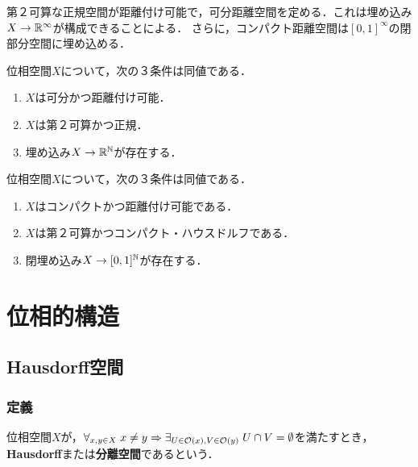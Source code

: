 \documentclass[uplatex,dvipdfmx]{jsreport}
\begin{document}
\begin{tcolorbox}[colframe=ForestGreen, colback=ForestGreen!10!white,breakable,colbacktitle=ForestGreen!40!white,coltitle=black,fonttitle=\bfseries\sffamily,
title=]
    第２可算な正規空間が距離付け可能で，可分距離空間を定める．これは埋め込み$X\to\mathbb{R}^\infty$が構成できることによる．
    さらに，コンパクト距離空間は$[0,1]^\infty$の閉部分空間に埋め込める．
\end{tcolorbox}

\begin{theorem}[Urysohnの距離付け定理]
    位相空間$X$について，次の３条件は同値である．
    \begin{enumerate}
        \item $X$は可分かつ距離付け可能．
        \item $X$は第２可算かつ正規．
        \item 埋め込み$X\to\mathbb{R}^{\mathbb{N}}$が存在する．
    \end{enumerate}
\end{theorem}

\begin{corollary}[AC, コンパクト距離空間は閉区間の可算積の閉部分空間と同相である]
    位相空間$X$について，次の３条件は同値である．
    \begin{enumerate}
        \item $X$はコンパクトかつ距離付け可能である．
        \item $X$は第２可算かつコンパクト・ハウスドルフである．
        \item 閉埋め込み$X\to[0,1]^{\mathbb{N}}$が存在する．
    \end{enumerate}
\end{corollary}

\chapter{位相的構造}

\section{Hausdorff空間}

\subsection{定義}

\begin{definition}
    位相空間$X$が，$\forall_{x,y\in X}\;x\ne y\Rightarrow\exists_{U\in\mathcal{O}(x),V\in\mathcal{O}(y)}\;U\cap V=\emptyset$を満たすとき，\textbf{Hausdorff}または\textbf{分離空間}であるという．
\end{definition}
\end{document}
